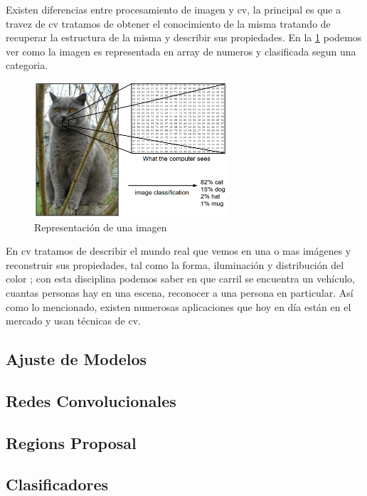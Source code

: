 Existen diferencias entre procesamiento de imagen y \ac{cv}, la principal es que a travez de \ac{cv} tratamos de obtener el conocimiento de la misma tratando de recuperar  la estructura de la misma y describir  sus propiedades. En la \ref{Fig: cv-1} podemos ver como la imagen es representada en array de numeros y clasificada segun una categoria.
\begin{figure}[H]
 \centering
  \includegraphics[height=5cm,keepaspectratio=true,clip=true]{imagenes/MarcoTeorico/cv-1.png}
  \caption{Representación de una imagen}
	\label{Fig: cv-1}
\end{figure}


En \ac{cv} tratamos de describir el mundo real que vemos en una o mas imágenes y reconstruir sus propiedades, tal como la forma, iluminación y distribución del color \citep{Szeliski}; con esta disciplina podemos saber en que carril se encuentra un vehículo, cuantas personas hay en una escena, reconocer a una persona en particular. Así como lo mencionado, existen numerosas aplicaciones que hoy en día están en el mercado  y usan técnicas de \ac{cv}. 




\subsection{Ajuste de Modelos}

\subsection{Redes Convolucionales}

\subsection{Regions Proposal}

\subsection{Clasificadores}








